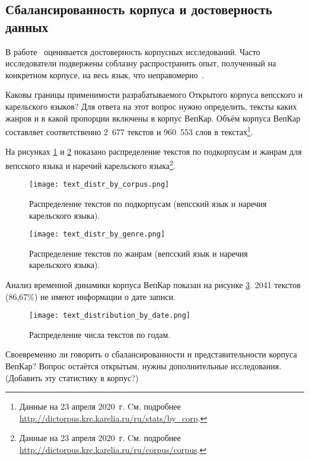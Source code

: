 \subsection{Сбалансированность корпуса и достоверность данных}

В работе~\cite{Belikov2013}
оценивается достоверность корпусных исследований. 
Часто исследователи подвержены соблазну распространить опыт, полученный на конкретном корпусе, 
на весь язык, что неправомерно~\cite{Belikov2013}.

Каковы границы применимости разрабатываемого Открытого корпуса вепсского и карельского языков? 
Для ответа на этот вопрос нужно определить, тексты каких жанров и в какой пропорции включены в корпус ВепКар. 
Объём корпуса ВепКар составляет соответственно 2~677 текстов и 960~553 слов в текстах\footnote{ Данные на 23 апреля 2020~г. Cм. подробнее 
\href{http://dictorpus.krc.karelia.ru/ru/stats/by\_corp}{http://dictorpus.krc.karelia.ru/ru/stats/by\_corp}.}.

На рисунках \ref{fig:text_distr_by_corpus} и \ref{fig:text_distr_by_genre} показано распределение текстов по подкорпусам и жанрам для вепсского языка и наречий карельского языка\footnote{ Данные на 23 апреля 2020~г. Cм. подробнее 
			\href{http://dictorpus.krc.karelia.ru/ru/corpus/corpus}{http://dictorpus.krc.karelia.ru/ru/corpus/corpus}.}.

\begin{figure}
    \centering
    \texttt{[image: text\_distr\_by\_corpus.png]}
    \caption{Распределение текстов по подкорпусам (вепсский язык и наречия карельского языка).}
    \label{fig:text_distr_by_corpus}
\end{figure}

\begin{figure}
    \centering
    \texttt{[image: text\_distr\_by\_genre.png]}
    \caption{Распределение текстов по жанрам (вепсский язык и наречия карельского языка).}
    \label{fig:text_distr_by_genre}
\end{figure}

Анализ временной динамики корпуса ВепКар показан на рисунке \ref{fig:text_distribution_by_date}. 2041 текстов (86,67\%) не имеют информации о дате записи.
\begin{figure}
    \centering
    \texttt{[image: text\_distribution\_by\_date.png]}
    \caption{Распределение числа текстов по годам.}
    \label{fig:text_distribution_by_date}
\end{figure}

Своевременно ли говорить о сбалансированности и представительности корпуса ВепКар? Вопрос остаётся открытым, нужны дополнительные исследования.
(Добавить эту статистику в корпус?)


